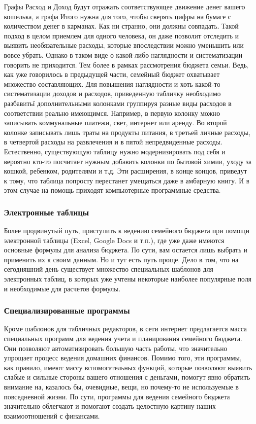 Графы Расход и Доход будут отражать соответствующее движение
денег вашего кошелька, а графа Итого нужна для того, чтобы сверять цифры на бумаге с количеством денег в карманах. Как ни странно, они должны
совпадать.
Такой подход в целом приемлем для одного человека, он даже позволит
отследить и выявить необязательные расходы, которые впоследствии можно
уменьшить или вовсе убрать. Однако в таком виде о какой-либо наглядности
и систематизации говорить не приходится. Тем более в рамках рассмотрения
бюджета семьи. Ведь, как уже говорилось в предыдущей части, семейный
бюджет охватывает множество составляющих.
Для повышения наглядности и хоть какой-то систематизации доходов и
расходов, приведенную табличку необходимо разбавитьї дополнительными
колонками группируя разные виды расходов в соответствии реально имеющимся.
Например, в первую колонку можно записывать коммунальные платежи,
свет, интернет или аренду. Во второй колонке записывать лишь траты на
продукты питания, в третьей личные расходы, в четвертой расходы на развлечения и в пятой непредвиденные расходы.
Естественно, существующую таблицу нужно модернизировать под себя и
вероятно кто-то посчитает нужным добавить колонки по бытовой химии, уходу за кошкой, ребенком, родителями и т.д.
Эти расширения, в конце концов, приведут к тому, что таблица попросту
перестанет умещаться даже в амбарную книгу. И в этом случае на помощь
приходят компьютерные программные средства.

\subsubsection{Электронные таблицы}
Более продвинутый путь, приступить к ведению семейного бюджета при
помощи электронной таблицы (Excel, Google Docs и т.п.), где уже даже имеются основные формулы для анализа бюджета. По сути, вам остается лишь
выбрать и применить их к своим данным. Но и тут есть путь проще.
Дело в том, что на сегодняшний день существует множество специальных
шаблонов для электронных таблиц, в которых уже учтены некоторые наиболее популярные поля и необходимые для расчетов формулы.
\subsubsection{Специализированные программы}
Кроме шаблонов для табличных редакторов, в сети интернет предлагается
масса специальных программ для ведения учета и планирования семейного
бюджета.
Они позволяют автоматизировать большую часть работы, что значительно
упрощает процесс ведения домашних финансов.
Помимо того, эти программы, как правило, имеют массу вспомогательных функций, которые позволяют выявить слабые и сильные стороны вашего отношения с деньгами, помогут явно обратить внимание на, казалось бы,
очевидные, вещи, но почему-то не используемые в повседневной жизни. По
сути, программы для ведения семейного бюджета значительно облегчают и
помогают создать целостную картину наших взаимоотношений с финансами.
